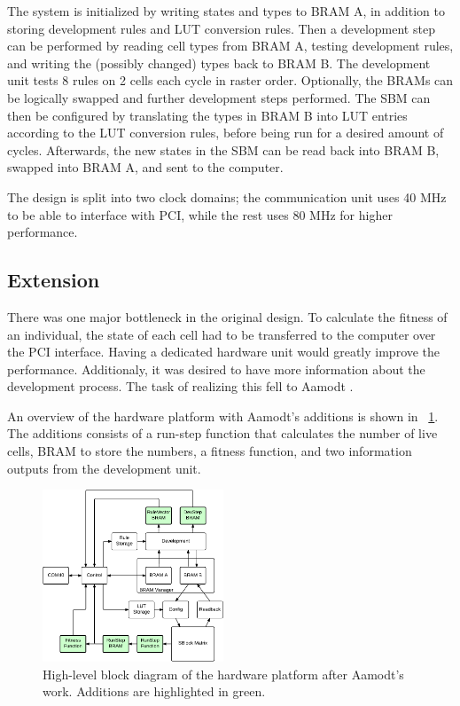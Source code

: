 The system is initialized by writing states and types to BRAM A, in addition to storing development rules and LUT conversion rules.
Then a development step can be performed by reading cell types from BRAM A\footnotemark, testing development rules, and writing the (possibly changed) types back to BRAM B.
The development unit tests 8 rules on 2 cells each cycle in raster order.
Optionally, the BRAMs can be logically swapped and further development steps performed.
The SBM can then be configured by translating the types in BRAM B into LUT entries according to the LUT conversion rules, before being run for a desired amount of cycles.
Afterwards, the new states in the SBM can be read back into BRAM B, swapped into BRAM A, and sent to the computer.

The design is split into two clock domains; the communication unit uses 40 MHz to be able to interface with PCI, while the rest uses 80 MHz for higher performance.

\subsection{Extension}

There was one major bottleneck in the original design.
To calculate the fitness of an individual, the state of each cell had to be transferred to the computer over the PCI interface.
Having a dedicated hardware unit would greatly improve the performance.
Additionaly, it was desired to have more information about the development process.
The task of realizing this fell to Aamodt \cite{aamodt2005sblock}.

An overview of the hardware platform with Aamodt's additions is shown in \figurename~\ref{fig:overview-aamodt}.
The additions consists of a run-step function that calculates the number of live cells, BRAM to store the numbers, a fitness function, and two information outputs from the development unit.

\begin{figure}[!ht]
    \centering
    \includegraphics[width=0.48\textwidth]{figures/overview-aamodt}
    \caption{High-level block diagram of the hardware platform after Aamodt's work. Additions are highlighted in green.}
    \label{fig:overview-aamodt}
\end{figure}

